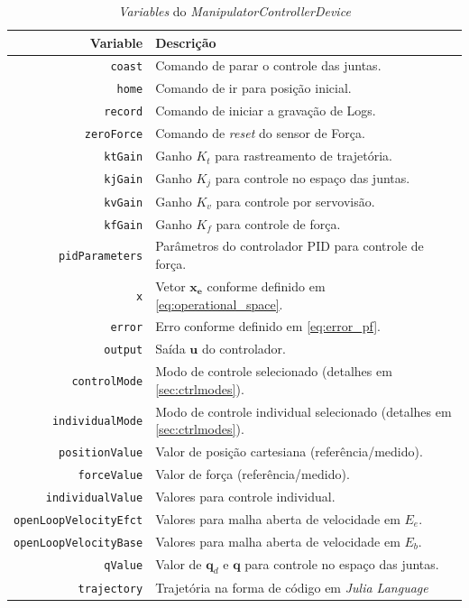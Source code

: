 \begin{table}[h!]
\centering
\caption{\textit{Variables} do \textit{ManipulatorControllerDevice}}
\label{tab:variables}
\begin{tabular}{rl} \hline
Variable & Descrição \\ \hline
\verb|coast| & 				Comando de parar o controle das juntas. \\
\verb|home| &  				Comando de ir para posição inicial. \\
\verb|record|& 				Comando de iniciar a gravação de Logs.\\
\verb|zeroForce|& 			Comando de \textit{reset} do sensor de Força.\\
\verb|ktGain|&				Ganho $K_t$ para rastreamento de trajetória. \\
\verb|kjGain|&				Ganho $K_j$ para controle no espaço das juntas.\\
\verb|kvGain|&				Ganho $K_v$ para controle por servovisão.\\
\verb|kfGain|&				Ganho $K_f$ para controle de força.\\
\verb|pidParameters|&		Parâmetros do controlador PID para controle de força.\\
\verb|x|&					Vetor $\bm{x_e}$ conforme definido em \ref{eq:operational_space}.\\				
\verb|error|&				Erro conforme definido em \ref{eq:error_pf}.\\
\verb|output|&				Saída $\bm{u}$ do controlador.\\
\verb|controlMode|&			Modo de controle selecionado (detalhes em \ref{sec:ctrlmodes}). \\
\verb|individualMode|&		Modo de controle individual selecionado (detalhes em \ref{sec:ctrlmodes}).\\
\verb|positionValue|&		Valor de posição cartesiana (referência/medido). \\
\verb|forceValue|&			Valor de força (referência/medido).\\
\verb|individualValue|&		Valores para controle individual.  \\
\verb|openLoopVelocityEfct|&Valores para malha aberta de velocidade em $E_e$. \\
\verb|openLoopVelocityBase|&Valores para malha aberta de velocidade em $E_b$. \\
\verb|qValue|&				Valor de $\bm{q}_d$ e $\bm{q}$ para controle no espaço das juntas.	\\
\verb|trajectory|&			Trajetória na forma de código em \textit{Julia Language}\\
\hline
\end{tabular}
\end{table}

